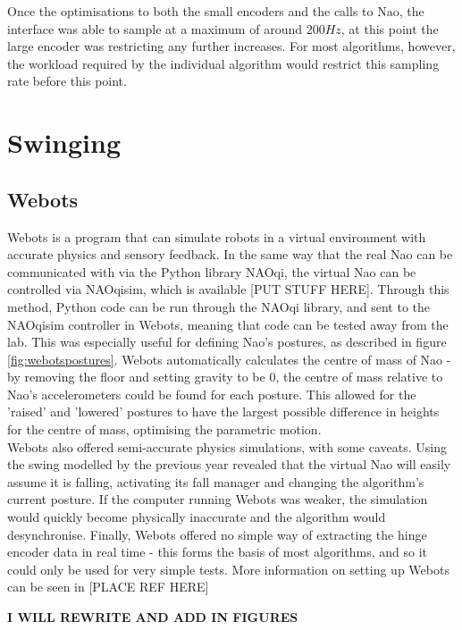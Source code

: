\documentclass[11pt]{article}
\newcommand*\ruleline[1]{\par\noindent\raisebox{.8ex}{\makebox[\linewidth]{\hrulefill\hspace{1ex}\raisebox{-.8ex}{#1}\hspace{1ex}\hrulefill}}}
\begin{document}
Once the optimisations to both the small encoders and the calls to Nao, the interface was able to sample at a maximum of around $200Hz$, at this point the large encoder was restricting any further increases. For most algorithms, however, the workload required by the individual algorithm would restrict this sampling rate before this point. 

\section{Swinging}

\subsection{Webots}
\ruleline{James Doering}
Webots is a program that can simulate robots in a virtual environment with accurate physics and sensory feedback. In the same way that the real Nao can be communicated with via the Python library NAOqi, the virtual Nao can be controlled via NAOqisim, which is available [PUT STUFF HERE]. Through this method, Python code can be run through the NAOqi library, and sent to the NAOqisim controller in Webots, meaning that code can be tested away from the lab. This was especially useful for defining Nao's postures, as described in figure \ref{fig:webotspostures}. Webots automatically calculates the centre of mass of Nao - by removing the floor and setting gravity to be 0, the centre of mass relative to Nao's accelerometers could be found for each posture. This allowed for the 'raised' and 'lowered' postures to have the largest possible difference in heights for the centre of mass, optimising the parametric motion.\\

Webots also offered semi-accurate physics simulations, with some caveats. Using the swing modelled by the previous year revealed that the virtual Nao will easily assume it is falling, activating its fall manager and changing the algorithm's current posture. If the computer running Webots was weaker, the simulation would quickly become physically inaccurate and the algorithm would desynchronise. Finally, Webots offered no simple way of extracting the hinge encoder data in real time - this forms the basis of most algorithms, and so it could only be used for very simple tests. More information on setting up Webots can be seen in [PLACE REF HERE]

\textbf{I WILL REWRITE AND ADD IN FIGURES}
\end{document}
